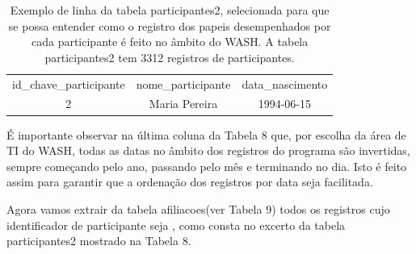\documentclass[
12pt,		%
openright,	%
twoside,  %
a4paper,			%
chapter=TITLE,		%
english,			%
french,				%
spanish,			%
brazil				%
]{USPSC-classe/USPSC}
\begin{document}
\begin{table}[htb]
\tiny
\caption{\label{96081f1bc28f7c738012f4beb3ef867b6b67107f}Exemplo de linha da tabela participantes2, selecionada para que se possa entender como o registro dos papeis desempenhados por cada participante \'e feito no \^ambito do WASH. A tabela participantes2 tem 3312 registros de participantes.}

\centering
\begin{tabular}{|c|c|c|}
\hline
id\_chave\_participante  &  nome\_participante             &  data\_nascimento  \\
                     2  &  Maria Pereira  &  1994-06-15 \\
\hline
\end{tabular}
\end{table}


\'E importante observar na \'ultima coluna da Tabela 8 que, por escolha da \'area de TI do WASH, todas as datas no \^ambito dos registros do programa s\~ao invertidas, sempre come\c{c}ando pelo ano, passando pelo m\^es e terminando no dia. Isto \'e feito assim para garantir que a ordena\c{c}\~ao dos registros por data seja facilitada.








Agora vamos extrair da tabela \textquotedbl afiliacoes\textquotedbl  (ver Tabela 9) todos os registros cujo identificador de participante seja \textquotedbl , como consta no excerto da tabela participantes2 mostrado na Tabela 8.
\end{document}
